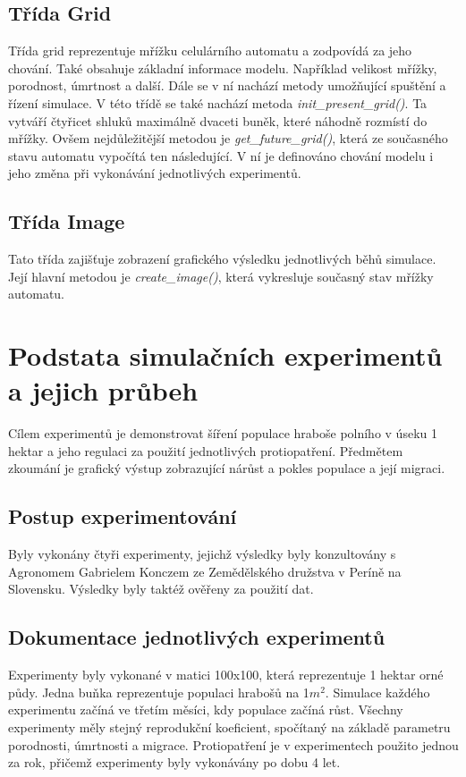 \documentclass[a4paper,11pt]{article}
\begin{document}
\subsection{Třída Grid}
Třída grid reprezentuje mřížku celulárního automatu a zodpovídá za jeho chování. Také obsahuje základní informace modelu. Například velikost mřížky, porodnost, úmrtnost a další. Dále se v ní nachází metody umožňující spuštění a řízení simulace. V této třídě se také nachází metoda \emph{init\_present\_grid()}. Ta vytváří čtyřicet shluků maximálně dvaceti buněk, které náhodně rozmístí do mřížky.
Ovšem nejdůležitější metodou je \emph{get\_future\_grid()}, která ze současného stavu automatu vypočítá ten následující. V ní je definováno chování modelu i jeho změna při vykonávání jednotlivých experimentů.

\subsection{Třída Image}
Tato třída zajišťuje zobrazení grafického výsledku jednotlivých běhů simulace. \\Její hlavní metodou je \emph{create\_image()}, která vykresluje současný stav mřížky automatu.


\section{Podstata simulačních experimentů a jejich průbeh}
Cílem experimentů je demonstrovat šíření populace hraboše polního v úseku 1 hektar a jeho regulaci za použití jednotlivých protiopatření. Předmětem zkoumání je grafický výstup zobrazující nárůst a pokles populace a její migraci. 
\subsection{Postup experimentování}
Byly vykonány čtyři experimenty, jejichž výsledky byly konzultovány s Agronomem Gabrielem Konczem ze Zemědělského družstva v Períně na Slovensku. Výsledky byly taktéž ověřeny za použití dat. \cite{Voles-popul-data:online}
\subsection{Dokumentace jednotlivých experimentů}
Experimenty byly vykonané v matici 100x100, která reprezentuje 1 hektar orné půdy. Jedna buňka reprezentuje populaci hrabošů na 1$m^{2}$. Simulace každého experimentu začíná ve třetím měsíci, kdy populace začíná růst. Všechny experimenty měly stejný reprodukční koeficient, spočítaný na základě parametru porodnosti, úmrtnosti a migrace. Protiopatření je v experimentech použito jednou za rok, přičemž experimenty byly vykonávány po dobu 4 let.
\end{document}
